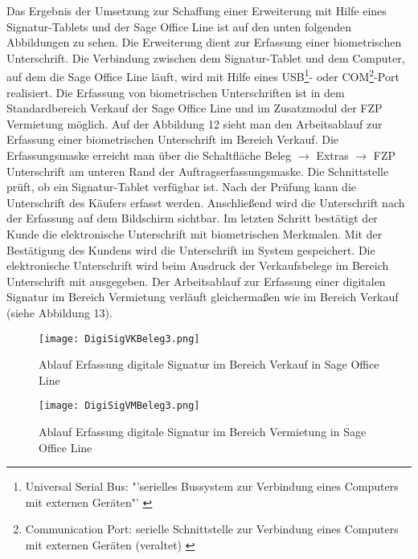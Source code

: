 Das Ergebnis der Umsetzung zur Schaffung einer Erweiterung mit Hilfe eines Signatur-Tablets und der Sage Office Line ist auf den unten folgenden Abbildungen zu sehen. Die Erweiterung dient zur Erfassung einer biometrischen Unterschrift. Die Verbindung zwischen dem Signatur-Tablet und dem Computer, auf dem die Sage Office Line läuft, wird mit Hilfe eines USB\footnote{Universal Serial Bus: "'serielles Bussystem zur Verbindung eines Computers mit externen Geräten"' \cite{USB}}- oder COM\footnote{Communication Port: serielle Schnittstelle zur Verbindung eines Computers mit externen Geräten (veraltet) \cite{COM}}-Port realisiert. Die Erfassung von biometrischen Unterschriften ist in dem Standardbereich Verkauf der Sage Office Line und im Zusatzmodul der FZP Vermietung möglich. Auf der Abbildung 12 sieht man den Arbeitsablauf zur Erfassung einer biometrischen Unterschrift im Bereich Verkauf. Die Erfassungsmaske erreicht man über die Schaltfläche Beleg $\rightarrow$ Extras $\rightarrow$ FZP Unterschrift am unteren Rand der Auftragserfassungsmaske. Die Schnittstelle prüft, ob ein Signatur-Tablet verfügbar ist. Nach der Prüfung kann die Unterschrift des Käufers erfasst werden. Anschließend wird die Unterschrift nach der Erfassung auf dem Bildschirm sichtbar. Im letzten Schritt bestätigt der Kunde die elektronische Unterschrift mit biometrischen Merkmalen. Mit der Bestätigung des Kundens wird die Unterschrift im System gespeichert. Die elektronische Unterschrift wird beim Ausdruck der Verkaufsbelege im Bereich Unterschrift mit ausgegeben. Der Arbeitsablauf zur Erfassung einer digitalen Signatur im Bereich Vermietung verläuft gleichermaßen wie im Bereich Verkauf (siehe Abbildung 13).

\begin{figure}[!ht]
    \centering
    \texttt{[image: DigiSigVKBeleg3.png]}
    \caption[Ablauf Erfassung digitale Signatur in Sage Office Line (Verkauf)]{\small{Ablauf Erfassung digitale Signatur im Bereich Verkauf in Sage Office Line}}
\end{figure}

\begin{figure}[!ht]
    \centering
    \texttt{[image: DigiSigVMBeleg3.png]}
    \caption[Ablauf Erfassung digitale Signatur in Sage Office Line (Vermietung)]{\small{Ablauf Erfassung digitale Signatur im Bereich Vermietung in Sage Office Line}}
\end{figure}